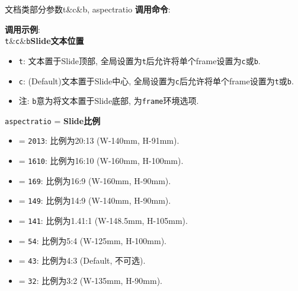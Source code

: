 \begin{frame}{文档类部分参数}{t\&c\&b, aspectratio}
	\textbf{调用命令}: 

  \textbf{调用示例}: \\
	
	\alert{\texttt{t}}\&\alert{\texttt{c}}\&\alert{\texttt{b}}\hfill \textbf{Slide文本位置}
	\begin{itemize}
		\item \texttt{t}: 文本置于Slide顶部, 全局设置为\texttt{t}后允许将单个frame设置为\texttt{c}或\texttt{b}.
		\item \texttt{c}: (Default)文本置于Slide中心, 全局设置为\texttt{c}后允许将单个frame设置为\texttt{t}或\texttt{b}.
		\item 注: \texttt{b}意为将文本置于Slide底部, 为\texttt{frame}环境选项.
	\end{itemize}
	
	\vspace*{1ex}\alert{\texttt{aspectratio} = }\hfill \textbf{Slide比例}
	\begin{itemize}
		\item {} = \texttt{2013}: 比例为20:13 (W-140mm, H-91mm).
		\item {} = \texttt{1610}: 比例为16:10 (W-160mm, H-100mm).
		\item {} = \texttt{169}: 比例为16:9 (W-160mm, H-90mm).
		\item {} = \texttt{149}: 比例为14:9 (W-140mm, H-90mm).
		\item {} = \texttt{141}: 比例为1.41:1 (W-148.5mm, H-105mm).
		\item {} = \texttt{54}: 比例为5:4 (W-125mm, H-100mm).
		\item {} = \texttt{43}: 比例为4:3 (Default, 不可选).
		\item {} = \texttt{32}: 比例为3:2 (W-135mm, H-90mm).
	\end{itemize}
\end{frame}

